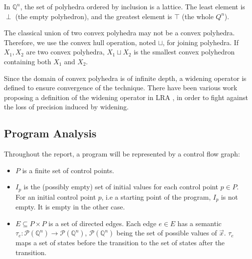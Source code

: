 \documentclass[a4paper,english,titlepage,11pt]{article}
\def\Q{\mathbb{Q}}
\def\P{\mathcal{P}}
\begin{document}
In $\Q^n$, the set of polyhedra ordered by inclusion is a lattice. The least element is $\perp$
(the empty polyhedron), and the greatest element is $\top$ (the whole $Q^n$).

The classical union of two convex polyhedra may not be a convex polyhedra.
Therefore, we use the convex hull operation, noted $\sqcup$, for joining
polyhedra. 
If $X_1, X_2$ are two convex polyhedra, $X_1 \sqcup X_2$ is the
smallest convex polyhedron containing both $X_1$ and $X_2$.

Since the domain of convex polyhedra is of infinite depth, a widening operator
is defined to ensure convergence of the technique. There have been various
work proposing a definition of the widening operator in LRA
\cite{CH78,Hal79,HPR97,BlanchetCousotEtAl_PLDI03}, in order to fight
against the loss of precision induced by widening.

\subsection{Program Analysis}

Throughout the report, a program will be represented by a control flow graph:
\begin{itemize}
\item $P$ is a finite set of control points.
\item $I_p$ is the (possibly empty)
set of initial values for each control point $p \in P$. For an initial control
point $p$, i.e a starting point of the program, $I_p$ is not empty. It is empty
in the other case.
\item $E \subseteq  P \times P$ is a set of directed edges. Each edge $e \in E$
has a semantic $\tau_e: \P(\Q^n) \rightarrow \P(\Q^n)$, $\P(\Q^n)$ being the set
of possible values of $\overrightarrow{x}$. $\tau_e$ maps a set of states before
the transition to the set of states after the transition.
\end{itemize}
\end{document}
